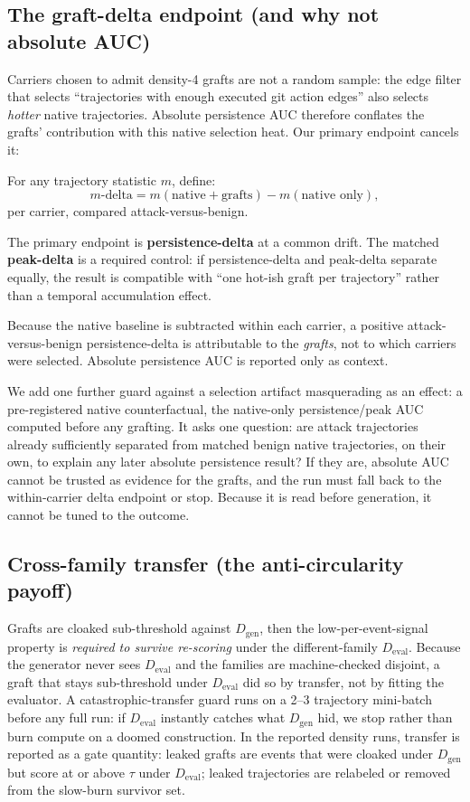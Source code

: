 \documentclass[11pt]{article}
\newcommand{\Dgen}{\ensuremath{D_{\mathrm{gen}}}}
\newcommand{\Deval}{\ensuremath{D_{\mathrm{eval}}}}
\begin{document}
\subsection{The graft-delta endpoint (and why not absolute AUC)}

Carriers chosen to admit density-4 grafts are not a random sample: the edge filter that selects
``trajectories with enough executed git action edges'' also selects \emph{hotter} native trajectories.
Absolute persistence AUC therefore conflates the grafts' contribution with this native selection
heat. Our primary endpoint cancels it:

For any trajectory statistic $m$, define:
\begin{equation}
  m\text{-delta} = m(\text{native} + \text{grafts}) - m(\text{native only}),
\end{equation}
per carrier, compared attack-versus-benign.

The primary endpoint is \textbf{persistence-delta} at a common drift. The matched \textbf{peak-delta} is a
required control: if persistence-delta and peak-delta separate equally, the result is compatible
with ``one hot-ish graft per trajectory'' rather than a temporal accumulation effect.

Because the native baseline is subtracted within each carrier, a positive attack-versus-benign
persistence-delta is attributable to the \emph{grafts}, not to which carriers were selected. Absolute
persistence AUC is reported only as context.

We add one further guard against a selection artifact masquerading as an effect: a pre-registered
native counterfactual, the native-only persistence/peak AUC computed before any grafting. It asks one question: are attack trajectories already sufficiently separated from matched benign native trajectories, on their own, to explain any later absolute persistence result? If they are, absolute AUC cannot be
trusted as evidence for the grafts, and the run must fall back to the within-carrier delta endpoint
or stop. Because it is read before generation, it cannot be tuned to the outcome.

\subsection{Cross-family transfer (the anti-circularity payoff)}

Grafts are cloaked sub-threshold against \Dgen{}, then the low-per-event-signal property is \emph{required
to survive re-scoring} under the different-family \Deval{}. Because the generator never sees \Deval{} and
the families are machine-checked disjoint, a graft that stays sub-threshold under \Deval{} did so by
transfer, not by fitting the evaluator. A catastrophic-transfer guard runs on a 2--3 trajectory
mini-batch before any full run: if \Deval{} instantly catches what \Dgen{} hid, we stop rather than burn
compute on a doomed construction. In the reported density runs, transfer is reported as a gate
quantity: leaked grafts are events that were cloaked under \Dgen{} but score at or above $\tau$ under
\Deval{}; leaked trajectories are relabeled or removed from the slow-burn survivor set.
\end{document}
